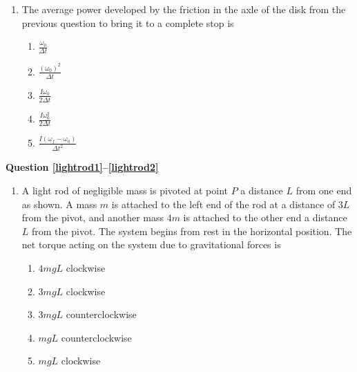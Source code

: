 \documentclass{../../../oss-classkick}
\begin{document}
\begin{multicols}{2}
\begin{enumerate}[leftmargin=18pt]
  \item The average power developed by the friction in the axle of the disk
    from the previous question to bring it to a complete stop is
    \begin{enumerate}[nosep,leftmargin=18pt,label=(\Alph*)]
    \item $\displaystyle\frac{\omega_0}{\Delta t}$
    \item $\displaystyle\frac{(\omega_0)^2}{\Delta t}$
    \item $\displaystyle\frac{I\omega_0}{2\Delta t}$
    \item $\displaystyle\frac{I\omega_0^2}{2\Delta t}$
    \item $\displaystyle\frac{I(\omega_f-\omega_0)}{\Delta t^2}$
    \end{enumerate}
    \columnbreak
  \end{enumerate}
  \textbf{Question \ref{lightrod1}--\ref{lightrod2}}
  \begin{enumerate}[leftmargin=18pt,resume]
  \item A light rod of negligible mass is pivoted at point $P$ a distance $L$
    from one end as shown. A mass $m$ is attached to the left end of the rod at
    a distance of $3L$ from the pivot, and another mass $4m$ is attached to the
    other end a distance $L$ from the pivot. The system begins from rest in the
    horizontal position. The net torque acting on the system due to
    gravitational forces is
    \label{lightrod1}
    \begin{center}
    \end{center}
    \begin{enumerate}[nosep,leftmargin=18pt,label=(\Alph*)]
    \item $4mgL$ clockwise
    \item $3mgL$ clockwise
    \item $3mgL$ counterclockwise
    \item $mgL$ counterclockwise
    \item $mgL$ clockwise
    \end{enumerate}
    \vspace{.7in}
    

\end{enumerate}
\end{multicols}
\end{document}
